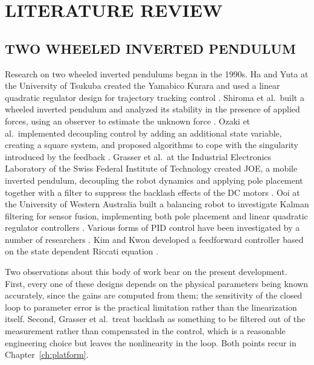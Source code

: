 \chapter{LITERATURE REVIEW}
\label{ch:lit}

\section{TWO WHEELED INVERTED PENDULUM}

Research on two wheeled inverted pendulums began in the 1990s. Ha and Yuta at
the University of Tsukuba created the Yamabico Kurara and used a linear
quadratic regulator design for trajectory tracking control \cite{ha1994trajectory}.
Shiroma et al.\ built a wheeled inverted pendulum and analyzed its stability in
the presence of applied forces, using an observer to estimate the unknown force
\cite{shiroma1996cooperative}. Ozaki et al.\ implemented decoupling control by
adding an additional state variable, creating a square system, and proposed
algorithms to cope with the singularity introduced by the feedback
\cite{ozaki2001position}. Grasser et al.\ at the Industrial Electronics
Laboratory of the Swiss Federal Institute of Technology created JOE, a mobile
inverted pendulum, decoupling the robot dynamics and applying pole placement
together with a filter to suppress the backlash effects of the DC motors
\cite{grasser2002joe}. Ooi at the University of Western Australia built a
balancing robot to investigate Kalman filtering for sensor fusion, implementing
both pole placement and linear quadratic regulator controllers
\cite{ooi2003balancing}. Various forms of PID control have been investigated by
a number of researchers
\cite{solis2011waseda,sun2010researching,guerrero2013realtime,miranda2009application}.
Kim and Kwon developed a feedforward controller based on the state dependent
Riccati equation \cite{kim2013nonlinear}.

Two observations about this body of work bear on the present development.
First, every one of these designs depends on the physical parameters being known
accurately, since the gains are computed from them; the sensitivity of the
closed loop to parameter error is the practical limitation rather than the
linearization itself. Second, Grasser et al.\ treat backlash as something to be
filtered out of the measurement rather than compensated in the control, which is
a reasonable engineering choice but leaves the nonlinearity in the loop. Both
points recur in Chapter~\ref{ch:platform}.

